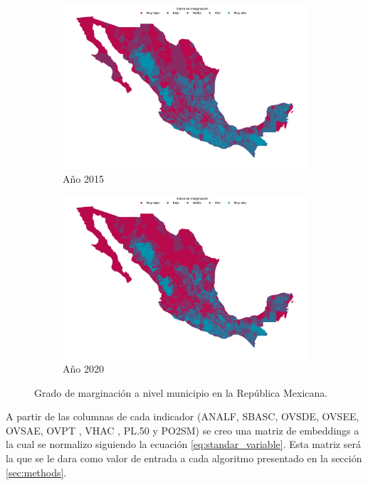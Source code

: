 \begin{figure}[H]
    \centering
    \begin{subfigure}{8.4cm}
        \caption{Año 2015}
        \includegraphics[width=1\linewidth]{Graphics/Data_2015/map.png}
    \end{subfigure}
    \begin{subfigure}{8.4cm}
        \caption{Año 2020}
        \includegraphics[width=1\linewidth]{Graphics/Data_2020/map.png}
    \end{subfigure}
    \caption{Grado de marginación a nivel municipio en la República Mexicana.}
    \label{fig:map_mexico}
\end{figure}

A partir de las columnas de cada indicador (ANALF, SBASC, OVSDE, OVSEE, OVSAE, OVPT , VHAC , PL.50 y PO2SM) se creo una matriz de embeddings a la cual se normalizo siguiendo la ecuación \ref{eq:standar_variable}. Esta matriz será la que se le dara como valor de entrada a cada algoritmo presentado en la sección \ref{sec:methods}.